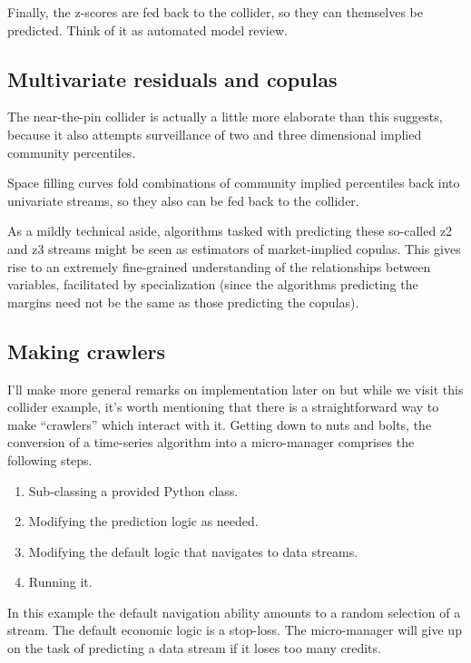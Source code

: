 Finally, the z-scores are fed back to the collider, so they can themselves be predicted. Think of it as automated model review. 

\subsection{Multivariate residuals and copulas}

The near-the-pin collider is actually a little more elaborate than this suggests, because it also attempts surveillance of two and three dimensional implied community percentiles. 

Space filling curves fold combinations of community implied percentiles back into univariate streams, so they also can be fed back to the collider. 

As a mildly technical aside, algorithms tasked with predicting these so-called z2 and z3 streams might be seen as estimators of market-implied copulas. This gives rise to an extremely fine-grained understanding of the relationships between variables, facilitated by specialization (since the algorithms predicting the margins need not be the same as those predicting the copulas). 

\subsection{Making crawlers}

I'll make more general remarks on implementation later on but while we visit this collider example, it's worth mentioning that there is a straightforward way to make ``crawlers'' which interact with it. Getting down to nuts and bolts, the conversion of a time-series algorithm into a micro-manager comprises the following steps. 

\begin{enumerate}
    \item Sub-classing a provided Python class. 
    \item Modifying the prediction logic as needed.  
    \item Modifying the default logic that navigates to data streams. 
    \item Running it. 
\end{enumerate}

In this example the default navigation ability amounts to a random selection of a stream. The default economic logic is a stop-loss. The micro-manager will give up on the task of predicting a data stream if it loses too many credits.   

